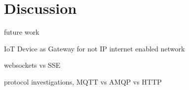 \section{Discussion}

future work

IoT Device as Gateway for not IP internet enabled network

websockets vs SSE

protocol investigations, MQTT vs AMQP vs HTTP

\pagebreak